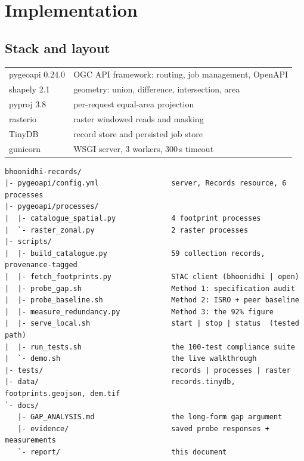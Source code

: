 \section{Implementation}
\label{sec:implementation}

\subsection{Stack and layout}

\begin{center}
\small
\begin{tabular}{@{}ll@{}}
\toprule
pygeoapi 0.24.0 & OGC API framework: routing, job management, OpenAPI \\
shapely 2.1     & geometry: union, difference, intersection, area \\
pyproj 3.8      & per-request equal-area projection \\
rasterio        & raster windowed reads and masking \\
TinyDB          & record store and persisted job store \\
gunicorn        & WSGI server, 3 workers, 300\,s timeout \\
\bottomrule
\end{tabular}
\end{center}

\begin{lstlisting}
bhoonidhi-records/
|- pygeoapi/config.yml                 server, Records resource, 6 processes
|- pygeoapi/processes/
|  |- catalogue_spatial.py             4 footprint processes
|  `- raster_zonal.py                  2 raster processes
|- scripts/
|  |- build_catalogue.py               59 collection records, provenance-tagged
|  |- fetch_footprints.py              STAC client (bhoonidhi | open)
|  |- probe_gap.sh                     Method 1: specification audit
|  |- probe_baseline.sh                Method 2: ISRO + peer baseline
|  |- measure_redundancy.py            Method 3: the 92% figure
|  |- serve_local.sh                   start | stop | status  (tested path)
|  |- run_tests.sh                     the 100-test compliance suite
|  `- demo.sh                          the live walkthrough
|- tests/                              records | processes | raster
|- data/                               records.tinydb, footprints.geojson, dem.tif
`- docs/
   |- GAP_ANALYSIS.md                  the long-form gap argument
   |- evidence/                        saved probe responses + measurements
   `- report/                          this document
\end{lstlisting}

